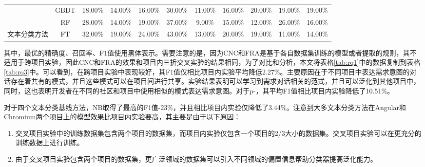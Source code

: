 \begin{table}[!htbp]
\begin{tabular}{|c|c|c|c|c|c|c|c|c|c|c|}
                                      & GBDT                       & 18.00\%                        & 14.00\%                        & 16.00\%                        & 30.00\%                        & 11.00\%                        & 16.00\%                        & 20.00\%                        & 19.00\%                        & 19.00\%                        \\ \cline{2-11} 
                                      & RF                         & 28.00\%                        & 14.00\%                        & 19.00\%                        & 37.00\%                        & 9.00\%                         & 15.00\%                        & 12.00\%                        & 26.00\%                        & 16.00\%                        \\ \cline{2-11} 
\multirow{-4}{*}{文本分类方法} & FT                         & 32.00\%                        & 19.00\%                        & 24.00\%                        & 43.00\%                        & 13.00\%                        & 20.00\%                        & 19.00\%                        & 11.00\%                        & 14.00\%                        \\ \hline
\end{tabular}
\end{table}

其中，最优的精确度、召回率、F1值使用黑体表示。需要注意的是，因为CNC和FRA是基于各自数据集训练的模型或者提取的规则，其不适用于跨项目实验，因此CNC和FRA的效果和项目内三折交叉实验的结果相同，为了对比和分析，本文将表格\ref{tab:rq1}中的数据复制到表格\ref{tab:rq3}中。可以看到，{\tool}在跨项目实验中表现较好，其F1值仅相比项目内实验平均降低2.27\%。主要原因在于不同项目中表达需求意图的对话存在着共有的模式，并且这些模式可以在项目间进行共享。实验结果表明{\tool}可以学习到需求对话相关的范式，并且可以泛化到其他项目中，同时，这也表明开发者在不同的社区和项目中使用相似的模式表达需求意图。对于p-{\tool}，其平均F1值相比项目内实验降低了10.51\%。

对于四个文本分类基线方法，NB取得了最高的F1值-23\%，并且相比项目内实验仅降低了3.44\%。注意到大多文本分类方法在Angular和Chromium两个项目上的模型效果比项目内实验要高，其主要是由于以下原因：
\begin{enumerate}
    \item 交叉项目实验中的训练数据集包含两个项目的数据集，而项目内实验仅包含一个项目的2/3大小的数据集。交叉项目实验可以在更充分的训练数据上进行训练。
    \item 由于交叉项目实验包含两个项目的数据集，更广泛领域的数据集可以引入不同领域的偏置信息帮助分类器提高泛化能力。
\end{enumerate}

